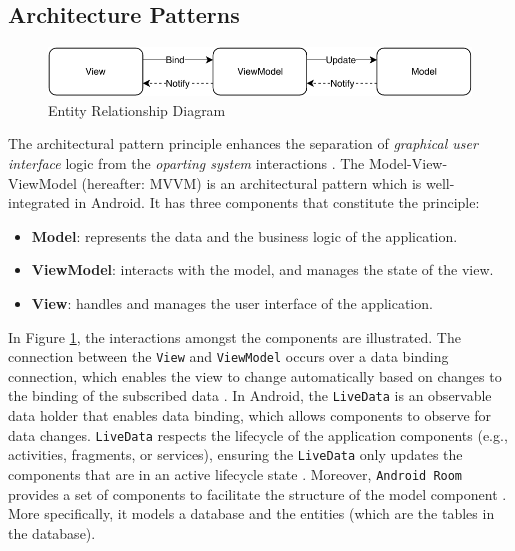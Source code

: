 \subsection{Architecture Patterns}

\begin{figure}
    \centering
    \includegraphics[scale=0.7]{images/MVVM.pdf}
    \caption{Entity Relationship Diagram}
    \label{fig:mvvm}
\end{figure}

The architectural pattern principle enhances the separation of \textit{graphical user interface} logic from the \textit{oparting system} interactions \cite{architecture}. The Model-View-ViewModel (hereafter: MVVM) is an architectural pattern which is well-integrated in Android. It has three components that constitute the principle:
\begin{itemize}
    \item \textbf{Model}: represents the data and the business logic of the application. 
    \item \textbf{ViewModel}: interacts with the model, and manages the state of the view.
    \item \textbf{View}: handles and manages the user interface of the application.
\end{itemize}

In Figure \ref{fig:mvvm}, the interactions amongst the components are illustrated. The connection between the \verb|View| and \verb|ViewModel| occurs over a data binding connection, which enables the view to change automatically based on changes to the binding of the subscribed data \cite{mvvm}. In Android, the \verb|LiveData| is an observable data holder that enables data binding, which allows components to observe for data changes. \verb|LiveData| respects the lifecycle of the application components (e.g., activities, fragments, or services), ensuring the \verb|LiveData| only updates the components that are in an active lifecycle state \cite{livedata}. Moreover, \verb|Android Room| provides a set of components to facilitate the structure of the model component \cite{room}. More specifically, it models a database and the entities (which are the tables in the database).

